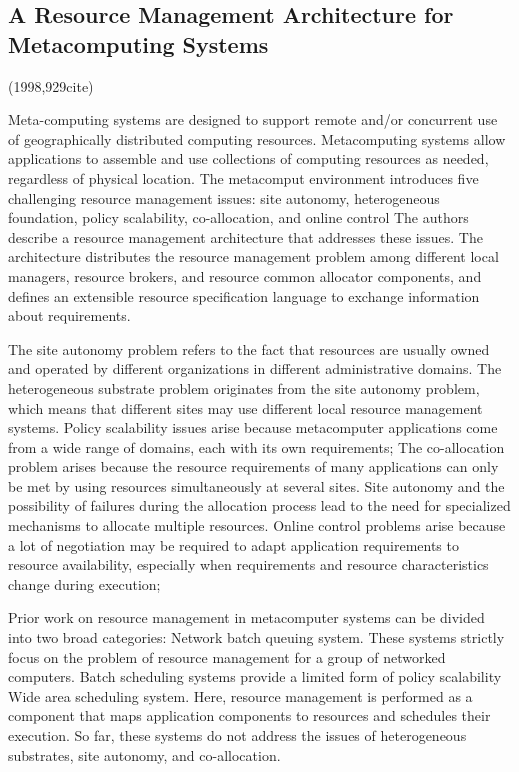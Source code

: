 \documentclass[a4paper,twoside]{scrbook}
\begin{document}
\subsection{A Resource Management Architecture for Metacomputing Systems \cite{czajkowski1998resource}}
(1998,929cite)\par
Meta-computing systems are designed to support remote and/or concurrent use of geographically distributed computing resources. Metacomputing systems allow applications to assemble and use collections of computing resources as needed, regardless of physical location.
The metacomput environment introduces five challenging resource management issues: site autonomy, heterogeneous foundation, policy scalability, co-allocation, and online control
The authors describe a resource management architecture that addresses these issues. The architecture distributes the resource management problem among different local managers, resource brokers, and resource common allocator components, and defines an extensible resource specification language to exchange information about requirements.
\par
The site autonomy problem refers to the fact that resources are usually owned and operated by different organizations in different administrative domains.
The heterogeneous substrate problem originates from the site autonomy problem, which means that different sites may use different local resource management systems.
Policy scalability issues arise because metacomputer applications come from a wide range of domains, each with its own requirements;
The co-allocation problem arises because the resource requirements of many applications can only be met by using resources simultaneously at several sites. Site autonomy and the possibility of failures during the allocation process lead to the need for specialized mechanisms to allocate multiple resources.
Online control problems arise because a lot of negotiation may be required to adapt application requirements to resource availability, especially when requirements and resource characteristics change during execution;
\par
Prior work on resource management in metacomputer systems can be divided into two broad categories:
Network batch queuing system. These systems strictly focus on the problem of resource management for a group of networked computers. Batch scheduling systems provide a limited form of policy scalability
Wide area scheduling system. Here, resource management is performed as a component that maps application components to resources and schedules their execution. So far, these systems do not address the issues of heterogeneous substrates, site autonomy, and co-allocation.
\end{document}
